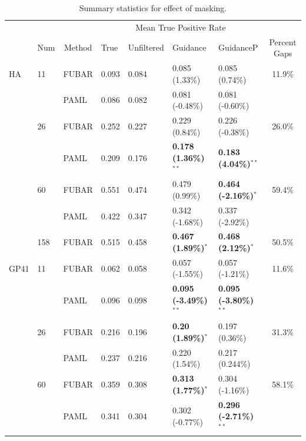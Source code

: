 \documentclass[11pt]{article}
\begin{document}
\begin{table}[htbp]
\begin{adjustwidth}{-1.85cm}{}
\caption {\label{tab:summarystats} Summary statistics for effect of masking.}
\begin{tabular}{l l l l l l l c}
\hline\noalign{\smallskip}
& & & \multicolumn{4}{c}{Mean True Positive Rate} \\
\cline{4-7}\noalign{\smallskip}
\multicolumn{1}{c}{Profile} & \multicolumn{1}{c}{Num} & \multicolumn{1}{c}{Method} & \multicolumn{1}{l}{True} & \multicolumn{1}{l}{Unfiltered} & \multicolumn{1}{l}{Guidance} & \multicolumn{1}{l}{GuidanceP} & \multicolumn{1}{c}{Percent Gaps} \\
\noalign{\smallskip}\hline\noalign{\smallskip}
HA  &  11  &  FUBAR  &  0.093  &  0.084  & 0.085 (1.33\%)  &  0.085 (0.74\%) & 11.9\% \\
  &    &  PAML  &  0.086  &  0.082  & 0.081 (-0.48\%)  &  0.081 (-0.60\%) &\\

 & 26 & FUBAR & 0.252 & 0.227 & 0.229 (0.84\%) & 0.226 (-0.38\%) & 26.0\%\\
 &   & PAML & 0.209 & 0.176 & \textbf{0.178 (1.36\%)$^{\ast\ast}$} & \textbf{0.183 (4.04\%)$^{\ast\ast}$} &\\

 & 60 & FUBAR & 0.551 & 0.474 & 0.479 (0.99\%) & \textbf{0.464 (-2.16\%)$^{\ast}$} & 59.4\%\\
 &  & PAML & 0.422 & 0.347 & 0.342 (-1.68\%) & 0.337 (-2.92\%) &\\

 & 158 & FUBAR & 0.515 & 0.458 & \textbf{0.467 (1.89\%)$^{\ast}$} & \textbf{0.468 (2.12\%)$^{\ast}$} & 50.5\%\\

GP41  &  11 &  FUBAR  &  0.062  &  0.058  &  0.057 (-1.55\%)  &  0.057 (-1.21\%) & 11.6\%\\
  &    &  PAML  &  0.096  &  0.098  & \textbf{0.095 (-3.49\%)$^{\ast\ast}$}  &  \textbf{0.095 (-3.80\%)$^{\ast\ast}$} &\\

 & 26 & FUBAR & 0.216 & 0.196 & \textbf{0.20 (1.89\%)$^{\ast}$} & 0.197 (0.36\%) & 31.3\%\\
 & & PAML & 0.237 & 0.216 & 0.220 (1.54\%) & 0.217 (0.244\%) &\\

 & 60 & FUBAR & 0.359 & 0.308 & \textbf{0.313 (1.77\%)$^{\ast}$} & 0.304 (-1.16\%) & 58.1\%\\
 & & PAML & 0.341 & 0.304 &0.302 (-0.77\%) & \textbf{0.296 (-2.71\%)$^{\ast\ast}$} & \\


\end{tabular}
\end{adjustwidth}
\end{table}
\end{document}
